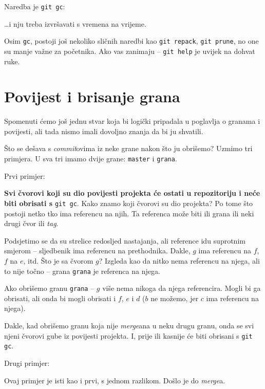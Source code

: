 Naredba je \verb+git gc+:



\dots{}i nju treba izvršavati s vremena na vrijeme.

Osim \verb+gc+, postoji još nekoliko sličnih naredbi kao \verb+git repack+, \verb+git prune+, no one su manje važne za početnika.
Ako vas zanimaju -- \verb+git help+ je uvijek na dohvat ruke.

\section*{Povijest i brisanje grana}

Spomenuti ćemo još jednu stvar koja bi logički pripadala u poglavlja o granama i povijesti, ali tada nismo imali dovoljno znanja da bi ju shvatili.

Što se dešava s \emph{commit}ovima iz neke grane nakon što ju obrišemo?
Uzmimo tri primjera.
U sva tri imamo dvije grane: \verb+master+ i \verb+grana+.

Prvi primjer:



\textbf{Svi čvorovi koji su dio povijesti projekta će ostati u repozitoriju i neće biti obrisati s} \verb+git gc+.
Kako znamo koji čvorovi su dio projekta?
Po tome što postoji netko tko ima referencu na njih.
Ta referenca može biti ili grana ili neki drugi čvor ili \emph{tag}.

Podsjetimo se da su strelice redosljed nastajanja, ali reference idu suprotnim smjerom -- sljedbenik ima referencu na prethodnika.
Dakle, $g$ ima referencu na $f$, $f$ na $e$, itd.
Što je sa čvorom $g$? 
Izgleda kao da nitko nema referencu na njega, ali to nije točno -- grana \verb+grana+ je referenca na njega.

Ako obrišemo granu \verb+grana+ -- $g$ više nema nikoga da njega referencira.
Mogli bi ga obrisati, ali onda bi mogli obrisati i $f$, $e$ i $d$ ($b$ ne možemo, jer $c$ ima referencu na njega).

Dakle, kad obrišemo granu koja nije \emph{merge}ana u neku drugu granu, onda se svi njeni čvorovi gube iz povijesti projekta.
I, prije ili kasnije će biti obrisani s \verb+git gc+.

Drugi primjer:



Ovaj primjer je isti kao i prvi, s jednom razlikom. 
Došlo je do \emph{merge}a.

